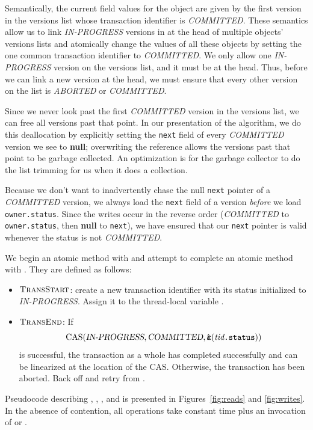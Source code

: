 Semantically, the current field values for the object are given by
the first version in 
the versions list whose transaction identifier is {\sl COMMITTED}\@.
These semantics allow us to link {\sl IN-PROGRESS} versions in at the head of
multiple objects' versions lists and atomically change the values of
all these objects by setting the one common transaction identifier to
{\sl COMMITTED}\@.  We only allow one {\sl IN-PROGRESS} version on the
versions list, and it must be at the head. Thus,
before we can link a new version at the head, we
must ensure that every other version on the list is {\sl ABORTED} or
{\sl COMMITTED}\@.

Since we never look past the first {\sl COMMITTED} version in the
versions list, we can free all versions past that point.  In our
presentation of the algorithm, we do this deallocation by explicitly setting the
{\tt next} field of every {\sl COMMITTED} version we see to {\bf null};
overwriting the reference allows the versions past that point to be garbage collected.
An optimization is for the garbage collector to do the list
trimming for us when it does a collection.


Because we don't want to inadvertently chase the null {\tt next} pointer
of a {\sl COMMITTED} version, we always load the {\tt next}
field of a version \emph{before} we load {\tt owner.status}.  Since
the writes occur in the reverse order ({\sl COMMITTED} to
{\tt owner.status}, then {\bf null} to {\tt next}), we have ensured that
our {\tt next} pointer is valid whenever the status is not {\sl COMMITTED}\@.

We begin an atomic method with  and attempt to
complete an atomic method with .  They are defined as
follows:
\begin{itemize}
\item $\text{\sc TransStart}$: create a new transaction identifier with
  its status initialized to {\sl IN-PROGRESS}\@.  Assign it to the
  thread-local variable .
\item $\text{\sc TransEnd}$:
  If
 $$\text{CAS}(\text{\sl IN-PROGRESS}, \text{\sl COMMITTED},
             \text{\tt \&}(\text{\it tid}\text{\tt .status}))$$
  is successful, the transaction as a whole has completed successfully
  and can be linearized at the location of the CAS\@.
  Otherwise, the transaction has been aborted.  Back off and retry from
  .
\end{itemize}
Pseudocode describing , , ,
and  is presented in Figures~\ref{fig:reads} and
\ref{fig:writes}.  In the absence of contention, all operations take
constant time plus an invocation of  or
.

